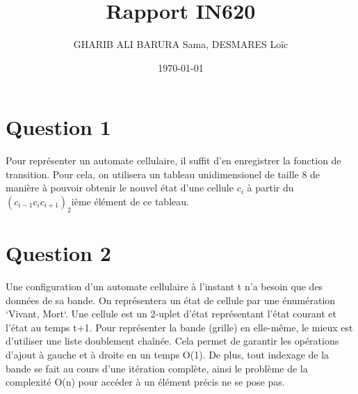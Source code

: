 \documentclass{article}
\title{Rapport IN620}
\date{\today}
\author{GHARIB ALI BARURA Sama, DESMARES Loïc}
\begin{document}
  \maketitle

  \newpage

  \section{Question 1}
    Pour représenter un automate cellulaire, il suffit d'en enregistrer la fonction de
  transition. Pour cela, on utilisera un tableau unidimensionel de taille 8 de manière
  à pouvoir obtenir le nouvel état d'une cellule \(c_i\) à partir du
  \((c_{i-1} c_i c_{i+1})_2\)ième élément de ce tableau.

  \section{Question 2}
      Une configuration d'un automate cellulaire à l'instant t n'a besoin que des données
  de sa bande. On représentera un état de cellule par une énumération `Vivant, Mort`.
  Une cellule est un 2-uplet d'état représentant l'état courant et l'état au temps t+1.
  Pour représenter la bande (grille) en elle-même, le mieux est d'utiliser une liste doublement
  chaînée. Cela permet de garantir les opérations d'ajout à gauche et à droite en un temps
  O(1). De plus, tout indexage de la bande se fait au cours d'une itération complète, ainsi
  le problème de la complexité O(n) pour accéder à un élément précis ne se pose pas.


  
\end{document}
